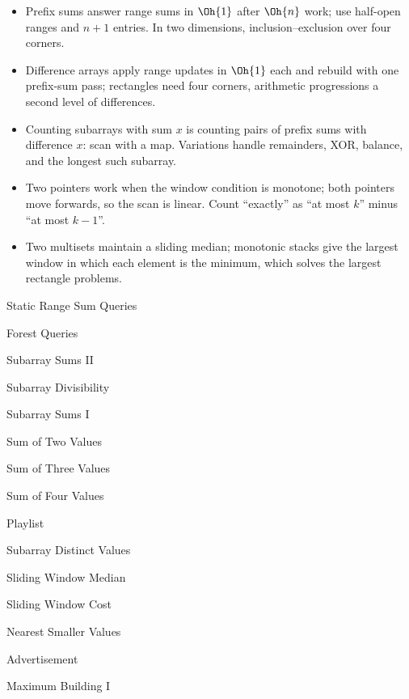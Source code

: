 \begin{summary}
\begin{itemize}
  \item Prefix sums answer range sums in $\Oh{1}$ after $\Oh{n}$ work; use half-open ranges and $n + 1$ entries. In two
        dimensions, inclusion--exclusion over four corners.
  \item Difference arrays apply range updates in $\Oh{1}$ each and rebuild with one prefix-sum pass; rectangles need four
        corners, arithmetic progressions a second level of differences.
  \item Counting subarrays with sum $x$ is counting pairs of prefix sums with difference $x$: scan with a map. Variations
        handle remainders, XOR, balance, and the longest such subarray.
  \item Two pointers work when the window condition is monotone; both pointers move forwards, so the scan is linear. Count
        ``exactly'' as ``at most $k$'' minus ``at most $k-1$''.
  \item Two multisets maintain a sliding median; monotonic stacks give the largest window in which each element is the
        minimum, which solves the largest rectangle problems.
\end{itemize}
\end{summary}

\begin{practice}
\begin{pplist}
  \item Static Range Sum Queries
  \item Forest Queries
  \item Subarray Sums II
  \item Subarray Divisibility
\end{pplist}
\begin{pplist}
  \item Subarray Sums I
  \item Sum of Two Values
  \item Sum of Three Values
  \item Sum of Four Values
  \item Playlist
  \item Subarray Distinct Values
\end{pplist}
\begin{pplist}
  \item Sliding Window Median
  \item Sliding Window Cost
  \item Nearest Smaller Values
  \item Advertisement
  \item Maximum Building I
\end{pplist}
\end{practice}
